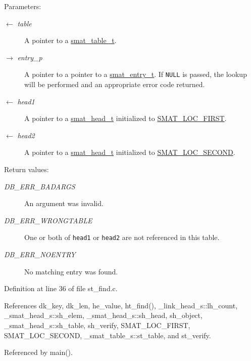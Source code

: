 \begin{Desc}
\item[Parameters:]
\begin{description}
\item[\mbox{$\leftarrow$} {\em table}]A pointer to a \hyperlink{group__dbprim__smat_ga0}{smat\_\-table\_\-t}. \item[\mbox{$\rightarrow$} {\em entry\_\-p}]A pointer to a pointer to a \hyperlink{group__dbprim__smat_ga2}{smat\_\-entry\_\-t}. If {\tt NULL} is passed, the lookup will be performed and an appropriate error code returned. \item[\mbox{$\leftarrow$} {\em head1}]A pointer to a \hyperlink{group__dbprim__smat_ga1}{smat\_\-head\_\-t} initialized to \hyperlink{group__dbprim__smat_gga70a137}{SMAT\_\-LOC\_\-FIRST}. \item[\mbox{$\leftarrow$} {\em head2}]A pointer to a \hyperlink{group__dbprim__smat_ga1}{smat\_\-head\_\-t} initialized to \hyperlink{group__dbprim__smat_gga70a138}{SMAT\_\-LOC\_\-SECOND}.\end{description}
\end{Desc}
\begin{Desc}
\item[Return values:]
\begin{description}
\item[{\em DB\_\-ERR\_\-BADARGS}]An argument was invalid. \item[{\em DB\_\-ERR\_\-WRONGTABLE}]One or both of {\tt head1} or {\tt head2} are not referenced in this table. \item[{\em DB\_\-ERR\_\-NOENTRY}]No matching entry was found.\end{description}
\end{Desc}


Definition at line 36 of file st\_\-find.c.

References dk\_\-key, dk\_\-len, he\_\-value, ht\_\-find(), \_\-link\_\-head\_\-s::lh\_\-count, \_\-smat\_\-head\_\-s::sh\_\-elem, \_\-smat\_\-head\_\-s::sh\_\-head, sh\_\-object, \_\-smat\_\-head\_\-s::sh\_\-table, sh\_\-verify, SMAT\_\-LOC\_\-FIRST, SMAT\_\-LOC\_\-SECOND, \_\-smat\_\-table\_\-s::st\_\-table, and st\_\-verify.

Referenced by main().

